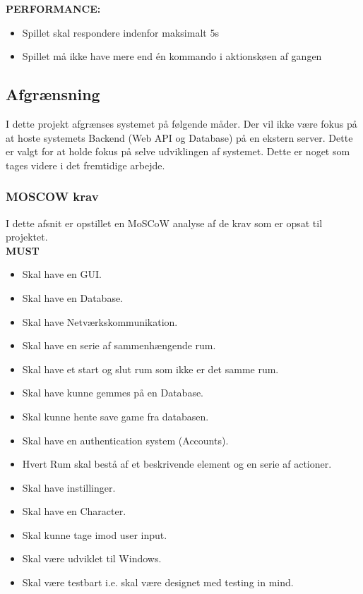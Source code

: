 \textbf{PERFORMANCE:}    

\begin{itemize}
  \item Spillet skal respondere indenfor maksimalt 5s
  \item Spillet må ikke have mere end én kommando i aktionskøen af gangen
\end{itemize}

\newpage

\subsection{Afgrænsning}
I dette projekt afgrænses systemet på følgende måder. Der vil ikke være fokus på at hoste systemets Backend (Web API og Database) på en ekstern server.
Dette er valgt for at holde fokus på selve udviklingen af systemet. Dette er noget som tages videre i det fremtidige arbejde.  

\subsubsection{MOSCOW krav}
\label{sssec:MOSCOW}
I dette afsnit er opstillet en MoSCoW analyse af de krav som er opsat til projektet.\\

\textbf{MUST}
\begin{itemize}
  \item Skal have en GUI.
  \item Skal have en Database.
  \item Skal have Netværkskommunikation.
  \item Skal have en serie af sammenhængende rum.
  \item Skal have et start og slut rum som ikke er det samme rum.
  \item Skal have kunne gemmes på en Database.
  \item Skal kunne hente save game fra databasen.
  \item Skal have en authentication system (Accounts).
  \item Hvert Rum skal bestå af et beskrivende element og en serie af actioner.
  \item Skal have instillinger.
  \item Skal have en Character.
  \item Skal kunne tage imod user input.
  \item Skal være udviklet til Windows.
  \item Skal være testbart i.e. skal være designet med testing in mind.
\end{itemize}


